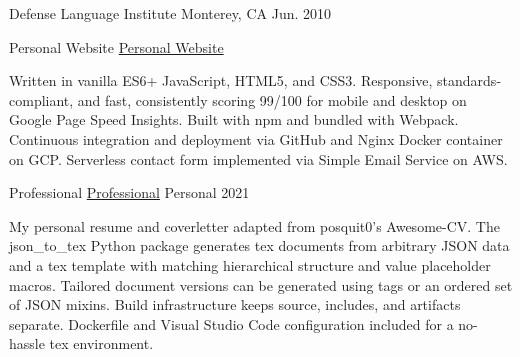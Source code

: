 \documentclass[11pt, a4paper]{cv}
\begin{document}
\begin{cv}
\begin{education}
\begin{cventries}
{\begin{cvitems}
\end{cvitems}}
\cventry
{\begin{degrees}
\end{degrees}}
{Defense Language Institute}
{Monterey, CA}
{Jun. 2010}
{\begin{cvitems}
\end{cvitems}}
\end{cventries}
\end{education}
\begin{projects}
\begin{cventries}
\cventrycompact
{
{Personal Website}
{\color{hrefblue}\href{https://brandon.mosher.xyz}{Personal Website}}}
{}
{}
{}
{\begin{cvparagraph}
Written in vanilla ES6+ JavaScript, HTML5, and CSS3. Responsive, standards-compliant, and fast, consistently scoring 99/100 for mobile and desktop on Google Page Speed Insights. Built with npm and bundled with Webpack. Continuous integration and deployment via GitHub and Nginx Docker container on GCP. Serverless contact form implemented via Simple Email Service on AWS.
\end{cvparagraph}}
\cventrycompact
{
{Professional}
{\color{hrefblue}\href{https://github.com/brandonmosher/professional}{Professional}}}
{}
{Personal}
{2021}
{\begin{cvparagraph}
My personal resume and coverletter adapted from posquit0's Awesome-CV. The json\_to\_tex Python package generates tex documents from arbitrary JSON data and a tex template with matching hierarchical structure and value placeholder macros. Tailored document versions can be generated using tags or an ordered set of JSON mixins. Build infrastructure keeps source, includes, and artifacts separate. Dockerfile and Visual Studio Code configuration included for a no-hassle tex environment.
\end{cvparagraph}}

\end{cventries}
\end{projects}
\end{cv}
\end{document}
